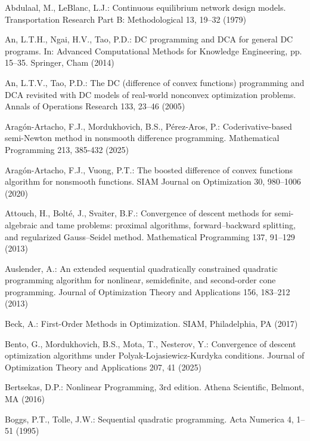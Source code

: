 \documentclass[11pt,a4paper]{article}
\theoremstyle{plain}
\begin{document}
\begin{thebibliography}{}

Abdulaal, M., LeBlanc, L.J.:
Continuous equilibrium network design models.
Transportation Research Part B: Methodological 13, 19--32 (1979)

An, L.T.H., Ngai, H.V., Tao, P.D.: 
DC programming and DCA for general DC programs. 
In: Advanced Computational Methods for Knowledge Engineering, pp. 15--35. 
Springer, Cham (2014)

An, L.T.V., Tao, P.D.: 
The DC (difference of convex functions) programming and DCA revisited with DC models of
real-world nonconvex optimization problems. 
Annals of Operations Research 133, 23--46 (2005)

Arag\'on-Artacho, F.J., Mordukhovich, B.S., P\'erez-Aros, P.:
Coderivative-based semi-Newton method in nonsmooth difference programming.
Mathematical Programming {213, 385-432 (2025)}

 Arag\'on-Artacho, F.J., Vuong, P.T.: The boosted difference of convex functions algorithm for nonsmooth functions. SIAM Journal on Optimization 30, 980--1006 (2020)

Attouch, H., Bolt\'e, J., Svaiter, B.F.:
Convergence of descent methods for semi-algebraic and tame problems: proximal algorithms, forward–backward splitting, and regularized Gauss–Seidel method.
Mathematical Programming 137, 91--129 (2013)

Auslender, A.:
An extended sequential quadratically constrained quadratic programming algorithm for nonlinear,
semidefinite, and second-order cone programming.
Journal of Optimization Theory and Applications 
156, 183--212 (2013)

Beck, A.:
First-Order Methods in Optimization. 
SIAM, Philadelphia, PA (2017)

Bento, G.,  Mordukhovich, B.S.,  Mota, T., Nesterov, Y.:
Convergence of descent optimization algorithms under Polyak-Lojasiewicz-Kurdyka conditions. %
{Journal of Optimization Theory and Applications 207, 41 (2025)}

Bertsekas, D.P.: 
Nonlinear Programming, 3rd edition. 
Athena Scientific, Belmont, MA (2016)

Boggs, P.T., Tolle, J.W.: 
Sequential quadratic programming. 
Acta Numerica 4, 1--51 (1995)


\end{thebibliography}
\end{document}
